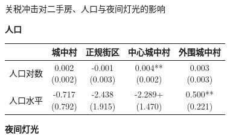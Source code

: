 \documentclass[aspectratio=169,10pt]{ctexbeamer}
\begin{document}
\begin{frame}[plain]{关税冲击对二手房、人口与夜间灯光的影响}
  \begin{minipage}[t]{0.48\textwidth}
    \centering
    \textbf{人口}
    \vspace{0.2em}
    \begin{tabular}{lcccc}
      \toprule
       & 城中村 & 正规街区 & 中心城中村 & 外围城中村 \\
      \midrule
      人口对数 & \makecell{0.002\\(0.002)} & \makecell{-0.001\\(0.003)} & \makecell{0.004**\\(0.002)} & \makecell{0.003\\(0.003)} \\
      人口水平 & \makecell{-0.717\\(0.792)} & \makecell{-2.438\\(1.915)} & \makecell{-2.289+\\(1.470)} & \makecell{0.500**\\(0.221)} \\
      \bottomrule
    \end{tabular}
  \end{minipage}
  \hfill
  \begin{minipage}[t]{0.48\textwidth}
    \centering
    \textbf{夜间灯光}
    \vspace{0.2em}
  \end{minipage}
\end{frame}
\end{document}
